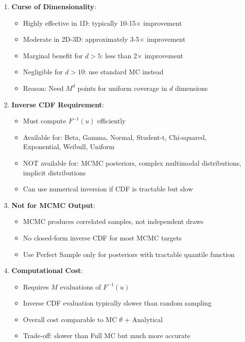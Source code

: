 \begin{enumerate}
\item \textbf{Curse of Dimensionality}:
\begin{itemize}
\item Highly effective in 1D: typically 10-15× improvement
\item Moderate in 2D-3D: approximately 3-5× improvement
\item Marginal benefit for $d > 5$: less than 2× improvement
\item Negligible for $d > 10$: use standard MC instead
\item Reason: Need $M^d$ points for uniform coverage in $d$ dimensions
\end{itemize}
\item \textbf{Inverse CDF Requirement}:
\begin{itemize}
\item Must compute $F^{-1}(u)$ efficiently
\item Available for: Beta, Gamma, Normal, Student-t, Chi-squared, Exponential, Weibull, Uniform
\item NOT available for: MCMC posteriors, complex multimodal distributions, implicit distributions
\item Can use numerical inversion if CDF is tractable but slow
\end{itemize}
\item \textbf{Not for MCMC Output}:
\begin{itemize}
\item MCMC produces correlated samples, not independent draws
\item No closed-form inverse CDF for most MCMC targets
\item Use Perfect Sample only for posteriors with tractable quantile function
\end{itemize}
\item \textbf{Computational Cost}:
\begin{itemize}
\item Requires $M$ evaluations of $F^{-1}(u)$
\item Inverse CDF evaluation typically slower than random sampling
\item Overall cost comparable to MC $\theta$ + Analytical
\item Trade-off: slower than Full MC but much more accurate
\end{itemize}
\end{enumerate}

